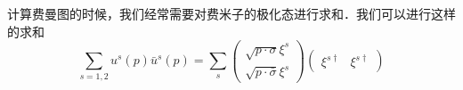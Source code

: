 
计算费曼图的时候，我们经常需要对费米子的极化态进行求和．我们可以进行这样的求和
\begin{equation}
\sum_{s = 1,2}u^s(p)\bar u^s(p )= \sum_s \begin{pmatrix}
\sqrt{p\cdot \sigma}\xi^s \\
\sqrt{p\cdot\bar\sigma} \xi^s
\end{pmatrix}\begin{pmatrix}
\xi^{s\dagger} & \xi^{s\dagger}
\end{pmatrix}
\end{equation}